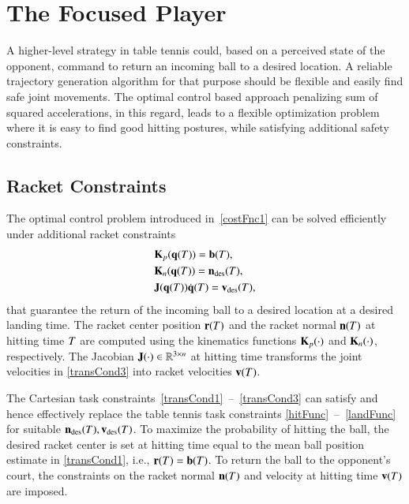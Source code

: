 \section{The Focused Player}\label{method}

A higher-level strategy in table tennis could, based on a perceived state of the opponent, command to return an incoming ball to a desired location. A reliable trajectory generation algorithm for that purpose should be flexible and easily find safe joint movements. The optimal control based approach penalizing sum of squared accelerations, in this regard, leads to a flexible optimization problem where it is easy to find good hitting postures, while satisfying additional safety constraints. 

\subsection{Racket Constraints}
%
The optimal control problem introduced in~\eqref{costFnc1} can be solved efficiently under additional racket constraints
%
%
\begin{align}
& \boldsymbol{\mathrm{K}}_p(\boldsymbol{\mathrm{q}}(T)) = \boldsymbol{\mathrm{b}}(T), \label{transCond1} \\
& \boldsymbol{\mathrm{K}}_n(\boldsymbol{\mathrm{q}}(T)) = \boldsymbol{\mathrm{n}}_{\mathrm{des}}(T), \label{transCond2}\\
& \boldsymbol{\mathrm{J}}(\boldsymbol{\mathrm{q}}(T))\dot{\boldsymbol{\mathrm{q}}}(T) = \boldsymbol{\mathrm{v}}_{\mathrm{des}}(T), \label{transCond3}
\end{align}
%
that guarantee the return of the incoming ball to a desired location at a desired landing time. The racket center position $\boldsymbol{\mathrm{r}}(T)$ and the racket normal $\boldsymbol{\mathrm{n}}(T)$ at hitting time $T$ are computed using the kinematics functions $\boldsymbol{\mathrm{K}}_p(\cdot)$ and $\boldsymbol{\mathrm{K}}_n(\cdot)$, respectively. The Jacobian $\boldsymbol{\mathrm{J}}(\cdot) \in \mathbb{R}^{3 \times n}$ \citep{Spong06} at hitting time transforms the joint velocities in \eqref{transCond3} into racket velocities $\boldsymbol{\mathrm{v}}(T)$. 

The Cartesian task constraints~\mbox{\eqref{transCond1} -- \eqref{transCond3}} can satisfy and hence effectively replace the table tennis task constraints \mbox{\eqref{hitFunc} -- \eqref{landFunc}} for suitable $\boldsymbol{\mathrm{n}}_{\mathrm{des}}(T), \boldsymbol{\mathrm{v}}_{\mathrm{des}}(T)$. To maximize the probability of hitting the ball, the desired racket center is set at hitting time equal to the mean ball position estimate in \eqref{transCond1}, i.e., $\boldsymbol{\mathrm{r}}(T) = \boldsymbol{\mathrm{b}}(T)$. To return the ball to the opponent's court, the constraints on the racket normal $\boldsymbol{\mathrm{n}}(T)$ and velocity at hitting time $\boldsymbol{\mathrm{v}}(T)$ are imposed. 
%
%
